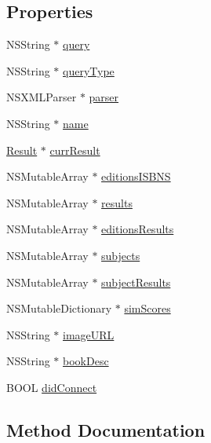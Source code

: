 \subsection*{Properties}
\begin{DoxyCompactItemize}
\item 
N\+S\+String $\ast$ \hyperlink{interface_search_aeb04e71a6ca5784a051a7cd63f4e2fc3}{query}
\item 
N\+S\+String $\ast$ \hyperlink{interface_search_ac031fcc0b2ce56fb19cdd9694b8cdf2b}{query\+Type}
\item 
N\+S\+X\+M\+L\+Parser $\ast$ \hyperlink{interface_search_a8e7108974b7159d08459abf52e203827}{parser}
\item 
N\+S\+String $\ast$ \hyperlink{interface_search_ab368ed5b801db165369ebc66c8fafab6}{name}
\item 
\hyperlink{interface_result}{Result} $\ast$ \hyperlink{interface_search_a4e82bb4f5a50ad85a1e2111b012f1a2d}{curr\+Result}
\item 
N\+S\+Mutable\+Array $\ast$ \hyperlink{interface_search_a07ba636aa360e7fb218bf734464861ef}{editions\+I\+S\+B\+N\+S}
\item 
N\+S\+Mutable\+Array $\ast$ \hyperlink{interface_search_a0668886a14e92186615ff6bc00411271}{results}
\item 
N\+S\+Mutable\+Array $\ast$ \hyperlink{interface_search_a3e2691a3fe915d4c9ba857bb4d15263a}{editions\+Results}
\item 
N\+S\+Mutable\+Array $\ast$ \hyperlink{interface_search_a5b0dd445df4f4e86e71b15f53a609083}{subjects}
\item 
N\+S\+Mutable\+Array $\ast$ \hyperlink{interface_search_ad219c19b30b84d04cbbd8a5c78a13139}{subject\+Results}
\item 
N\+S\+Mutable\+Dictionary $\ast$ \hyperlink{interface_search_a7263d296cac4a23ef4ece7cbfd95aa35}{sim\+Scores}
\item 
N\+S\+String $\ast$ \hyperlink{interface_search_af1ea0a6d823560bf22ac7ecda4b45189}{image\+U\+R\+L}
\item 
N\+S\+String $\ast$ \hyperlink{interface_search_a5b0aeea3349b499dd87950c5ef889003}{book\+Desc}
\item 
B\+O\+O\+L \hyperlink{interface_search_a8d9005724e3ac7c89acb6aaf84ed1c0a}{did\+Connect}
\end{DoxyCompactItemize}


\subsection{Method Documentation}
\hypertarget{interface_search_a296ad648ed932881f08849d95a5d5c95}{}
